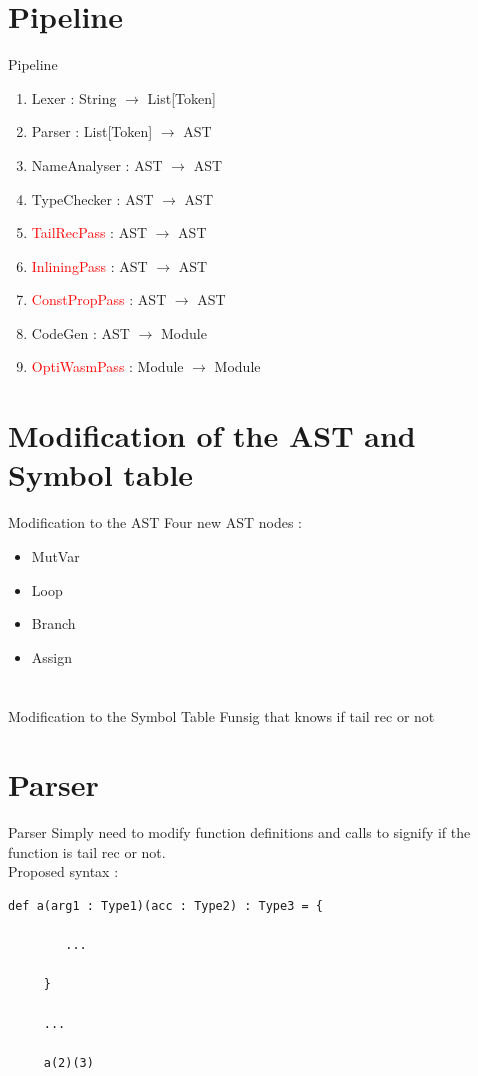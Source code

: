 \documentclass{beamer}
\renewcommand{\emph}{\textcolor{red}}
\begin{document}
\section{Pipeline}
\begin{frame}{Pipeline}
    \begin{enumerate}
        \item Lexer : String $\rightarrow$ List[Token]
        \item Parser : List[Token] $\rightarrow$ AST
        \item NameAnalyser : AST $\rightarrow$ AST
        \item TypeChecker : AST $\rightarrow$ AST
        \item \emph{TailRecPass} : AST $\rightarrow$ AST
        \item \emph{InliningPass} : AST $\rightarrow$ AST
        \item \emph{ConstPropPass} : AST $\rightarrow$ AST
        \item CodeGen : AST $\rightarrow$ Module
        \item \emph{OptiWasmPass} : Module $\rightarrow$ Module
    \end{enumerate}
\end{frame}

\section{Modification of the AST and Symbol table}
\begin{frame}{Modification to the AST}
Four new AST nodes :
\begin{itemize}
    \item MutVar
    \item Loop
    \item Branch
    \item Assign
\end{itemize}
\end{frame}

\section{}
\begin{frame}{Modification to the Symbol Table}
    Funsig that knows if tail rec or not
\end{frame}

\section{Parser}
\begin{frame}[fragile]{Parser}
     Simply need to modify function definitions and calls to signify if the function is tail rec or not. \\
     Proposed syntax :
     \begin{lstlisting}[basicstyle=\ttfamily]
     def a(arg1 : Type1)(acc : Type2) : Type3 = {
     
        ...
     
     }
     
     ...
     
     a(2)(3)
     \end{lstlisting}
\end{frame}
\end{document}
